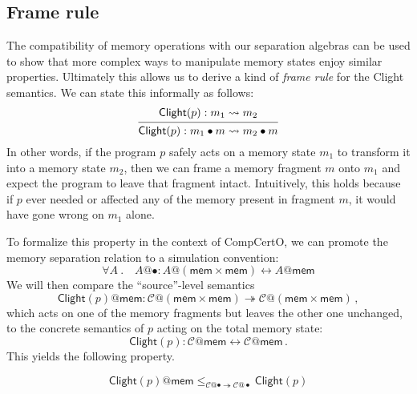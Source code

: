 \documentclass[acmsmall,screen,review,anonymous]{acmart}
\newcommand{\kw}[1]{\ensuremath{ \mathsf{#1} }}
\newcommand{\Clight}{\ensuremath{ \mathsf{Clight} }}
\begin{document}

\subsection{Frame rule} %

The compatibility of memory operations with our separation algebras
can be used to show that
more complex ways to manipulate memory states
enjoy similar properties.
Ultimately this allows us to derive
a kind of \emph{frame rule} for the Clight semantics.
We can state this informally as follows:
\[
  \begin{prooftree}
    \hypo{\Clight(p) : m_1 \leadsto m_2}
    \infer1{\Clight(p) : m_1 \bullet m \leadsto m_2 \bullet m}
  \end{prooftree}
\]
In other words,
if the program $p$ safely acts on a memory state $m_1$
to transform it into a memory state $m_2$,
then we can frame a memory fragment $m$ onto $m_1$
and expect the program to leave that fragment intact.
Intuitively, this holds because
if $p$ ever needed or affected any of the memory present
in fragment $m$,
it would have gone wrong on $m_1$ alone.

To formalize this property in the context of CompCertO,
we can promote the memory separation relation
to a simulation convention:
\[
  \forall A \:.\quad
  A@{\bullet} : A@(\kw{mem} \times \kw{mem}) \leftrightarrow A@\kw{mem}
\]
We will then compare the ``source''-level semantics
\[
  \Clight(p)@\kw{mem} :
    \mathcal{C}@(\kw{mem} \times \kw{mem}) \twoheadrightarrow
    \mathcal{C}@(\kw{mem} \times \kw{mem})
  \,,
\]
which acts on one of the memory fragments
but leaves the other one unchanged,
to the concrete semantics of $p$ acting on the total memory state:
\[
  \Clight(p) : \mathcal{C}@\kw{mem} \leftrightarrow \mathcal{C}@\kw{mem}
  \,.
\]
This yields the following property.

\begin{lemma}
\[
  \Clight(p)@\kw{mem}
  \le_{\mathcal{C}@{\bullet} \twoheadrightarrow \mathcal{C}@{\bullet}}
  \Clight(p)
\]
\end{lemma}


\end{document}

